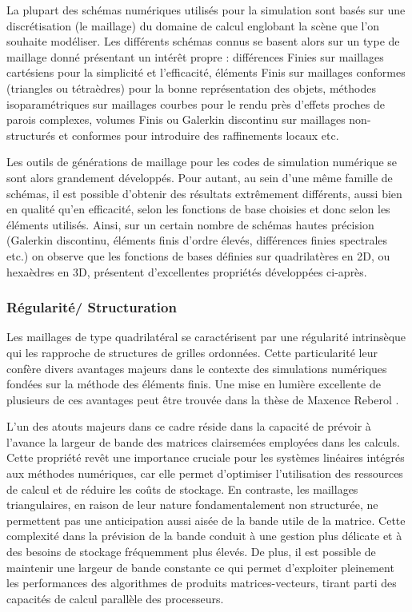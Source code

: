 La plupart des schémas numériques utilisés pour la simulation sont basés sur une discrétisation (le maillage) du domaine de calcul englobant la scène que l'on souhaite modéliser. Les différents schémas connus se basent alors sur un type de maillage donné présentant un intérêt propre : différences Finies sur maillages cartésiens pour la simplicité et l'efficacité, éléments Finis sur maillages conformes (triangles ou tétraèdres) pour la bonne représentation des objets, méthodes isoparamétriques sur maillages courbes pour le rendu près d'effets proches de parois complexes, volumes Finis ou Galerkin discontinu sur maillages non-structurés et conformes pour introduire des raffinements locaux etc.

Les outils de générations de maillage pour les codes de simulation numérique se sont alors grandement développés. Pour autant, au sein d'une même famille de schémas, il est possible d'obtenir des résultats extrêmement différents, aussi bien en qualité qu'en efficacité, selon les fonctions de base choisies et donc selon les éléments utilisés. Ainsi, sur un certain nombre de schémas hautes précision (Galerkin discontinu, éléments finis d'ordre élevés, différences finies spectrales etc.) on observe que les fonctions de bases définies sur quadrilatères en 2D, ou hexaèdres en 3D, présentent d'excellentes propriétés développées ci-après.

\subsubsection{Régularité/ Structuration}

Les maillages de type quadrilatéral se caractérisent par une régularité intrinsèque qui les rapproche de structures de grilles ordonnées. Cette particularité leur confère divers avantages majeurs dans le contexte des simulations numériques fondées sur la méthode des éléments finis. Une mise en lumière excellente de plusieurs de ces avantages peut être trouvée dans la thèse de Maxence Reberol \cite{reberol2018maillages}.

L'un des atouts majeurs dans ce cadre réside dans la capacité de prévoir à l'avance la largeur de bande des matrices clairsemées employées dans les calculs. Cette propriété revêt une importance cruciale pour les systèmes linéaires intégrés aux méthodes numériques, car elle permet d'optimiser l'utilisation des ressources de calcul et de réduire les coûts de stockage. En contraste, les maillages triangulaires, en raison de leur nature fondamentalement non structurée, ne permettent pas une anticipation aussi aisée de la bande utile de la matrice. Cette complexité dans la prévision de la bande conduit à une gestion plus délicate et à des besoins de stockage fréquemment plus élevés. De plus, il est possible de maintenir une largeur de bande constante ce qui permet d'exploiter pleinement les performances des algorithmes de produits matrices-vecteurs, tirant parti des capacités de calcul parallèle des processeurs.

